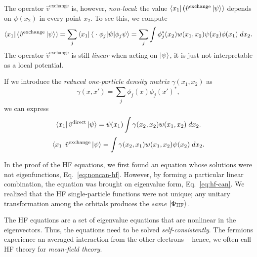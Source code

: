 \documentclass{report}
\theoremstyle{plain}
\theoremstyle{definition}
\begin{document}
The operator $\hat{v}^\text{exchange}$ is, however,
\emph{non-local}: the value
$\bra{x_1}(\hat{v}^\text{exchange}\ket{\psi})$ depends on $\psi(x_2)$
in every point $x_2$. To see this, we compute
\begin{equation}
  \bra{x_1}(\hat{v}^\text{exchange}\ket{\psi}) =
  \sum_j \bra{x_1}\braket{\;\cdot\; \phi_j|\hat{w}|\phi_j\psi} =
  \sum_j \int \phi_j^*(x_2) w(x_1,x_2) \psi(x_2) \phi(x_1) \; dx_2.
\end{equation}
The operator $\hat{v}^\text{exchange}$ is still \emph{linear} when
acting on $\ket{\psi}$, it is just not interpretable as a local
potential.

If we introduce the \emph{reduced one-particle density matrix}
$\gamma(x_1,x_2)$ as
\begin{equation}
  \gamma(x,x') = \sum_j \phi_j(x)\phi_j(x')^*,
\end{equation}
we can express
\begin{equation}
  \bra{x_1}\hat{v}^\text{direct}\ket{\psi} = \psi(x_1) \int
  \gamma(x_2,x_2)w(x_1,x_2) \; dx_2 .
\end{equation}
\begin{equation}
  \bra{x_1}\hat{v}^\text{exchange}\ket{\psi} = \int
  \gamma(x_2,x_1)w(x_1,x_2)  \psi(x_2) \; dx_2 .
\end{equation}

In the proof of the HF equations, we first found an equation whose solutions were not
eigenfunctions, Eq.~\eqref{eq:noncan-hf}. However, by forming a
particular linear combination, the equation was brought on eigenvalue
form, Eq.~\eqref{eq:hf-can}. We realized that the HF single-particle
functions were not unique; any unitary transformation among the
orbitals produces the \emph{same} $\ket{\Phi_\text{HF}}$.


The HF equations are a set of eigenvalue equations that are nonlinear
in the eigenvectors. Thus, the equations need to be solved
\emph{self-consistently}. The fermions experience an averaged
interaction from the other electrons -- hence, we often call HF theory
for \emph{mean-field theory}.


\end{document}
